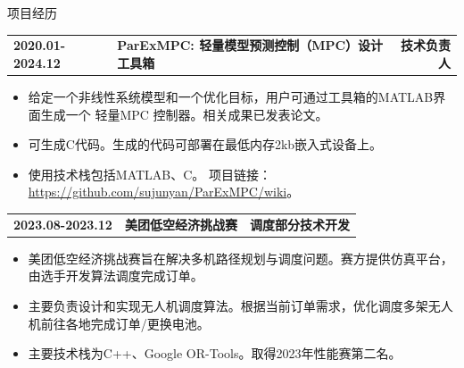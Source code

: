 \documentclass{resume} %
\makeatletter
\newcommand{\projectheader}[3]{%
  \begin{tabular*}{\linewidth}{@{}l@{\extracolsep{\fill}}l@{\extracolsep{\fill}}r@{}}
    \textbf{#1} & \textbf{#2} & \textbf{#3} \\
  \end{tabular*}%
  \vspace{-0.5em} %
}
\makeatother
\begin{document}
\begin{rSection}{项目经历}
    \newpage
    \vspace{3mm}
    \projectheader{2020.01-2024.12}{ParExMPC: 轻量模型预测控制（MPC）设计工具箱}{技术负责人}
    \begin{itemize}
        \item 给定一个非线性系统模型和一个优化目标，用户可通过工具箱的MATLAB界面生成一个 轻量MPC 控制器。相关成果已发表论文。
        \item 可生成C代码。生成的代码可部署在最低内存2kb嵌入式设备上。
        \item 使用技术栈包括MATLAB、C。 项目链接：\href{https://github.com/sujunyan/ParExMPC/wiki}{https://github.com/sujunyan/ParExMPC/wiki}。
    \end{itemize}

    \vspace{3mm}
    \projectheader{2023.08-2023.12}{美团低空经济挑战赛}{调度部分技术开发}
    \begin{itemize}
        \item 美团低空经济挑战赛旨在解决多机路径规划与调度问题。赛方提供仿真平台，由选手开发算法调度完成订单。
        \item 主要负责设计和实现无人机调度算法。根据当前订单需求，优化调度多架无人机前往各地完成订单/更换电池。
        \item 主要技术栈为C++、Google OR-Tools。取得2023年性能赛第二名。
    \end{itemize}





\end{rSection}
\end{document}
